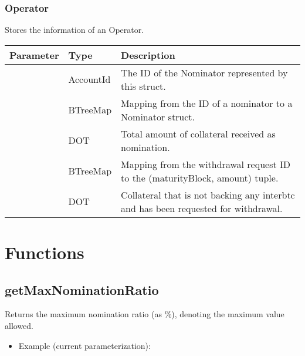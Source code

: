\documentclass[a4paper,10pt,english]{sphinxmanual}
\begin{document}
\subsubsection{Operator}
\label{\detokenize{spec/nomination:operator}}
Stores the information of an Operator.


\begin{savenotes}\sphinxattablestart
\centering
\begin{tabulary}{\linewidth}[t]{|l|l|L|}
\hline
\sphinxstyletheadfamily 
Parameter
&\sphinxstyletheadfamily 
Type
&\sphinxstyletheadfamily 
Description
\\
\hline
{}
&
AccountId
&
The ID of the Nominator represented by this struct.
\\
\hline
{}
&
BTreeMap
&
Mapping from the ID of a nominator to a Nominator struct.
\\
\hline
{}
&
DOT
&
Total amount of collateral received as nomination.
\\
\hline
{}
&
BTreeMap
&
Mapping from the withdrawal request ID to the (maturityBlock, amount) tuple.
\\
\hline
{}
&
DOT
&
Collateral that is not backing any interbtc and has been requested for withdrawal.
\\
\hline
\end{tabulary}
\par
\sphinxattableend\end{savenotes}


\section{Functions}
\label{\detokenize{spec/nomination:functions}}

\subsection{getMaxNominationRatio}
\label{\detokenize{spec/nomination:getmaxnominationratio}}\label{\detokenize{spec/nomination:id2}}
Returns the maximum nomination ratio (as \%), denoting the maximum  value allowed.
\begin{itemize}
\item {} 
Example (current parameterization): 

\end{itemize}
\end{document}
